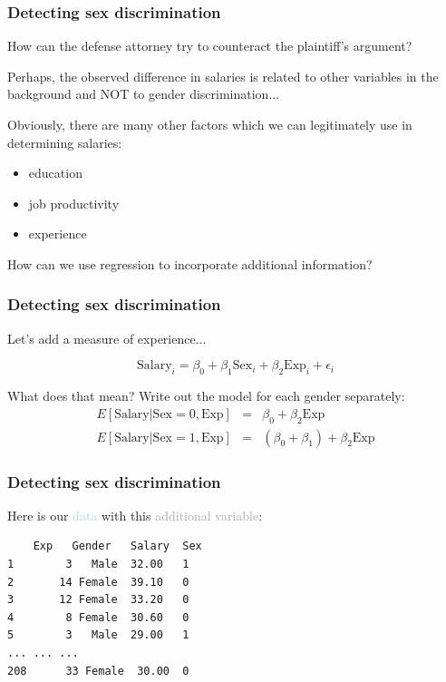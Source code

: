 \documentclass{beamer}
\newcommand{\lb}[1]{\textcolor{lightblue}{#1}}
\newcommand{\dg}[1]{\textcolor{darkgray}{#1}}
\newcommand{\bi}{\begin{itemize}}
\newcommand{\ib}{\end{itemize}}
\newcommand{\sk}{\vspace{.5cm}}
\newcommand{\sko}{\vspace{.1in}}
\newcommand{\skoo}{\vspace{.2in}}
\begin{document}
\begin{frame}
\frametitle{Detecting sex discrimination}
 {\color{burntorange} How can the defense attorney try to counteract the plaintiff's argument?}

\skoo

Perhaps, the observed difference in salaries is related to other variables in the background and {\color{lightblue}NOT} to gender discrimination...

\skoo
Obviously, there are many other factors which we can legitimately use in determining salaries:
\bi
\item education
\item job productivity
\item experience
\ib

\sko
{\color{lightblue}How can we use regression to incorporate additional information?}

\end{frame}


\begin{frame}
\frametitle{Detecting sex discrimination}
Let's add a measure of experience...

\sk
$$
\text{Salary}_i = \beta_0 + \beta_1\text{Sex}_i + \beta_2\text{Exp}_i + \epsilon_i
$$

\sk

{\color{burntorange} What does that mean?  Write out the model for each gender separately:}
\begin{eqnarray*}
E[\text{Salary} | \text{Sex} = 0, \text{Exp}] &=& \beta_0 + \beta_2 \text{Exp} \\
E[\text{Salary} | \text{Sex} = 1, \text{Exp}] &=& (\beta_0 + \beta_1) + \beta_2 \text{Exp}
\end{eqnarray*}


\end{frame}

\begin{frame}[containsverbatim]
\frametitle{Detecting sex discrimination}

Here is our \lb{data} with this \dg{additional variable}:

\sk
\begin{verbatim}
    Exp   Gender   Salary  Sex
1        3   Male  32.00   1
2       14 Female  39.10   0
3       12 Female  33.20   0
4        8 Female  30.60   0
5        3   Male  29.00   1
... ... ... 
208      33 Female  30.00  0
\end{verbatim}
\end{frame}
\end{document}
